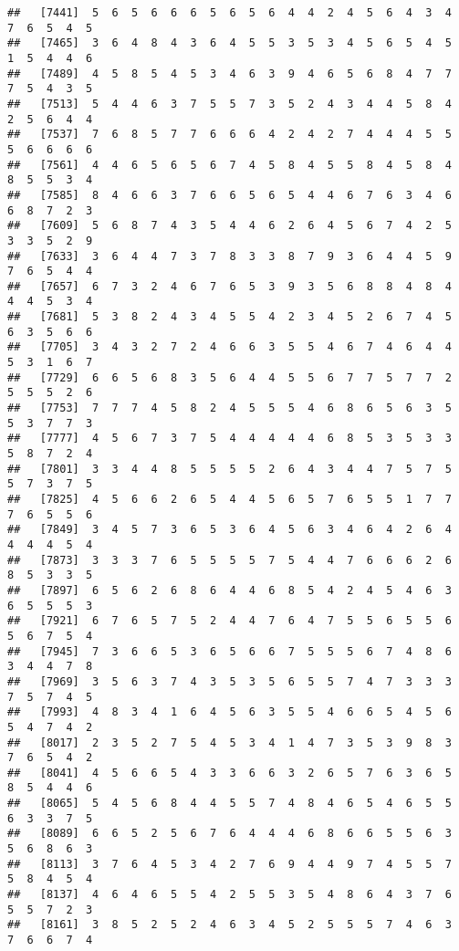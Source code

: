 \documentclass[
]{book}
\begin{document}
\begin{verbatim}
##   [7441]  5  6  5  6  6  6  5  6  5  6  4  4  2  4  5  6  4  3  4  7  6  5  4  5
##   [7465]  3  6  4  8  4  3  6  4  5  5  3  5  3  4  5  6  5  4  5  1  5  4  4  6
##   [7489]  4  5  8  5  4  5  3  4  6  3  9  4  6  5  6  8  4  7  7  7  5  4  3  5
##   [7513]  5  4  4  6  3  7  5  5  7  3  5  2  4  3  4  4  5  8  4  2  5  6  4  4
##   [7537]  7  6  8  5  7  7  6  6  6  4  2  4  2  7  4  4  4  5  5  5  6  6  6  6
##   [7561]  4  4  6  5  6  5  6  7  4  5  8  4  5  5  8  4  5  8  4  8  5  5  3  4
##   [7585]  8  4  6  6  3  7  6  6  5  6  5  4  4  6  7  6  3  4  6  6  8  7  2  3
##   [7609]  5  6  8  7  4  3  5  4  4  6  2  6  4  5  6  7  4  2  5  3  3  5  2  9
##   [7633]  3  6  4  4  7  3  7  8  3  3  8  7  9  3  6  4  4  5  9  7  6  5  4  4
##   [7657]  6  7  3  2  4  6  7  6  5  3  9  3  5  6  8  8  4  8  4  4  4  5  3  4
##   [7681]  5  3  8  2  4  3  4  5  5  4  2  3  4  5  2  6  7  4  5  6  3  5  6  6
##   [7705]  3  4  3  2  7  2  4  6  6  3  5  5  4  6  7  4  6  4  4  5  3  1  6  7
##   [7729]  6  6  5  6  8  3  5  6  4  4  5  5  6  7  7  5  7  7  2  5  5  5  2  6
##   [7753]  7  7  7  4  5  8  2  4  5  5  5  4  6  8  6  5  6  3  5  5  3  7  7  3
##   [7777]  4  5  6  7  3  7  5  4  4  4  4  4  6  8  5  3  5  3  3  5  8  7  2  4
##   [7801]  3  3  4  4  8  5  5  5  5  2  6  4  3  4  4  7  5  7  5  5  7  3  7  5
##   [7825]  4  5  6  6  2  6  5  4  4  5  6  5  7  6  5  5  1  7  7  7  6  5  5  6
##   [7849]  3  4  5  7  3  6  5  3  6  4  5  6  3  4  6  4  2  6  4  4  4  4  5  4
##   [7873]  3  3  3  7  6  5  5  5  5  7  5  4  4  7  6  6  6  2  6  8  5  3  3  5
##   [7897]  6  5  6  2  6  8  6  4  4  6  8  5  4  2  4  5  4  6  3  6  5  5  5  3
##   [7921]  6  7  6  5  7  5  2  4  4  7  6  4  7  5  5  6  5  5  6  5  6  7  5  4
##   [7945]  7  3  6  6  5  3  6  5  6  6  7  5  5  5  6  7  4  8  6  3  4  4  7  8
##   [7969]  3  5  6  3  7  4  3  5  3  5  6  5  5  7  4  7  3  3  3  7  5  7  4  5
##   [7993]  4  8  3  4  1  6  4  5  6  3  5  5  4  6  6  5  4  5  6  5  4  7  4  2
##   [8017]  2  3  5  2  7  5  4  5  3  4  1  4  7  3  5  3  9  8  3  7  6  5  4  2
##   [8041]  4  5  6  6  5  4  3  3  6  6  3  2  6  5  7  6  3  6  5  8  5  4  4  6
##   [8065]  5  4  5  6  8  4  4  5  5  7  4  8  4  6  5  4  6  5  5  6  3  3  7  5
##   [8089]  6  6  5  2  5  6  7  6  4  4  4  6  8  6  6  5  5  6  3  5  6  8  6  3
##   [8113]  3  7  6  4  5  3  4  2  7  6  9  4  4  9  7  4  5  5  7  5  8  4  5  4
##   [8137]  4  6  4  6  5  5  4  2  5  5  3  5  4  8  6  4  3  7  6  5  5  7  2  3
##   [8161]  3  8  5  2  5  2  4  6  3  4  5  2  5  5  5  7  4  6  3  7  6  6  7  4

\end{verbatim}
\end{document}
